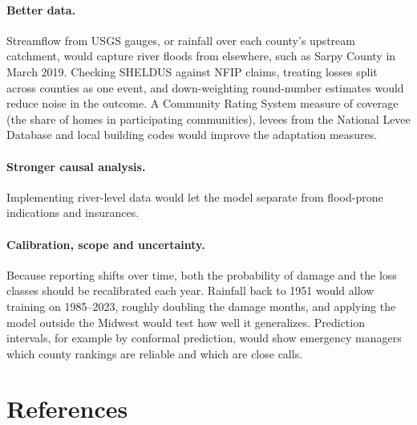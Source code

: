 \documentclass[10pt,twocolumn]{article}
\begin{document}
\paragraph{Better data.} Streamflow from USGS gauges, or rainfall over each county's upstream
catchment, would capture river floods from elsewhere, such as Sarpy County in March 2019. Checking
SHELDUS against NFIP claims, treating losses split across counties as one event, and down-weighting
round-number estimates would reduce noise in the outcome. A Community Rating System measure of
coverage (the share of homes in participating communities), levees from the National Levee
Database and local building codes would improve the adaptation measures.

\paragraph{Stronger causal analysis.} Implementing river-level data would let the model separate from flood-prone indications and insurances.

\paragraph{Calibration, scope and uncertainty.} Because reporting shifts over time, both the
probability of damage and the loss classes should be recalibrated each year. Rainfall back to 1951
would allow training on 1985--2023, roughly doubling the damage months, and applying the model
outside the Midwest would test how well it generalizes. Prediction intervals, for example by
conformal prediction, would show emergency managers which county rankings are reliable and which
are close calls.


\section{References}
\end{document}
